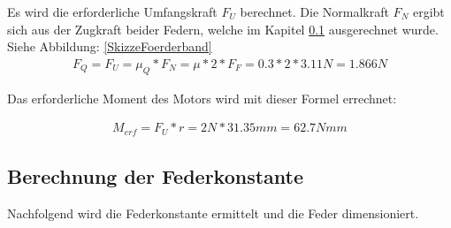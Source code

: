 Es wird die erforderliche Umfangskraft $F_U$ berechnet. Die Normalkraft $F_N$ ergibt sich aus der Zugkraft beider Federn, welche im Kapitel \ref{Berechnung_Feder} ausgerechnet wurde. Siehe Abbildung: \ref{SkizzeFoerderband}
\begin{align*}
F_Q= F_U=\mu_Q*F_N = \mu*2*F_{F} = 0.3*2*3.11N = 1.866N
\end{align*}

Das erforderliche Moment des Motors wird mit dieser Formel errechnet:

\begin{align*}
M_{erf}=F_U*r=2N*31.35mm=62.7Nmm
\end{align*}

\subsection{Berechnung der Federkonstante}
\label{Berechnung_Feder}

Nachfolgend wird die Federkonstante ermittelt und die Feder dimensioniert.

